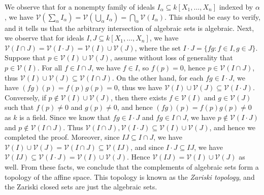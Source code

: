 \documentclass[11pt]{book}
\begin{document}
We observe that for a nonempty family of ideals $I_{\alpha}\subseteq k[X_1,\dots,X_n]$ indexed by $\alpha$, we have $\mathcal{V}(\sum_{\alpha}I_{\alpha})=\mathcal{V}(\bigcup_{\alpha}I_{\alpha})=\bigcap_{\alpha}\mathcal{V}(I_{\alpha})$. This should be easy to verify, and it tells us that the arbitrary intersection of algebraic sets is algebraic. Next, we observe that for ideals $I,J\subseteq k[X_1,\dots,X_n]$, we have $\mathcal{V}(I\cap J)=\mathcal{V}(I\cdot J)=\mathcal{V}(I)\cup \mathcal{V}(J)$, where the set $I\cdot J=\{fg:f\in I,g\in J\}$. Suppose that $p\in \mathcal{V}(I)\cup \mathcal{V}(J)$, assume without loss of generality that $p\in \mathcal{V}(I)$. For all $f\in I\cap J$, we have $f\in I$, so $f(p)=0$, hence $p\in \mathcal{V}(I\cap J)$, thus $\mathcal{V}(I)\cup\mathcal{V}(J)\subseteq \mathcal{V}(I\cap J)$. On the other hand, for each $fg\in I\cdot J$, we have $(fg)(p)=f(p)g(p)=0$, thus we have $\mathcal{V}(I)\cup\mathcal{V}(J)\subseteq \mathcal{V}(I\cdot J)$. Conversely, if $p\not\in \mathcal{V}(I)\cup \mathcal{V}(J)$, then there exists $f\in \mathcal{V}(I)$ and $g\in \mathcal{V}(J)$ such that $f(p)\ne 0$ and $g(p)\ne 0$, and hence $(fg)(p)=f(p)g(p)\ne 0$ as $k$ is a field. Since we know that $fg\in I\cdot J$ and $fg\in I\cap J$, we have $p\not\in \mathcal{V}(I\cdot J)$ and $p\not\in \mathcal{V}(I\cap J)$. Thus $\mathcal{V}(I\cap J),\mathcal{V}(I\cdot J)\subseteq \mathcal{V}(I)\cup\mathcal{V}(J)$, and hence we completed the proof. Moreover, since $IJ\subseteq I\cap J$, we have $\mathcal{V}(I)\cup\mathcal{V}(J)=\mathcal{V}(I\cap J)\subseteq\mathcal{V}(IJ)$, and since $I\cdot J\subseteq IJ$, we have $\mathcal{V}(IJ)\subseteq\mathcal{V}(I\cdot J)=\mathcal{V}(I)\cup\mathcal{V}(J)$. Hence $\mathcal{V}(IJ)=\mathcal{V}(I)\cup\mathcal{V}(J)$ as well. From these facts, we conclude that the complements of algebraic sets form a topology of the affine space. This topology is known as the \textit{Zariski topology}, and the Zariski closed sets are just the algebraic sets.
\end{document}
